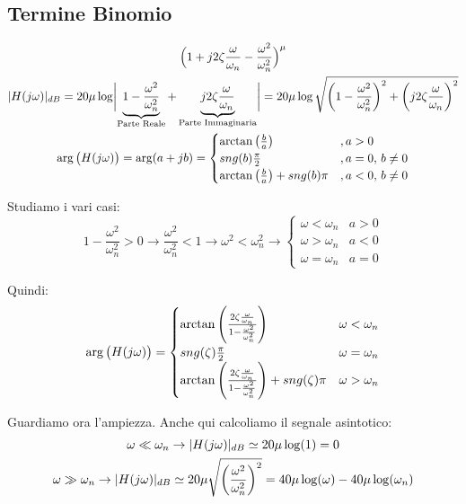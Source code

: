 \subsection{Termine Binomio}
\begin{gather*}
	\Big(1+j2\zeta\frac{\omega}{\omega_{n}}-\frac{\omega^2}{\omega^{2}_{n}} \Big)^{\mu}\\
	\abs{H(j\omega)}_{dB} = 20 \mu \log \Abs{\underbrace{1-\frac{\omega^2}{\omega^{2}_{n}}}_{\text{\scriptsize Parte Reale}}+\underbrace{j2\zeta\frac{\omega}{\omega_{n}}}_{\text{\scriptsize Parte Immaginaria}}} = 20\mu \log \sqrt{\bigg(1-\frac{\omega^2}{\omega^{2}_{n}} \bigg)^2+\bigg(j2\zeta\frac{\omega}{\omega_{n}}\bigg)^2}\\
	\arg\big(H(j\omega)\big) = \arg(a+jb) = 
	\begin{cases}
		\arctan\big(\frac{b}{a}\big) & ,a>0\\
		\sng(b)\frac{\pi}{2} & ,a=0,\, b \ne 0\\
		\arctan\big(\frac{b}{a}\big) + \sng(b)\pi & ,a<0,\, b \ne 0 
	\end{cases} 
\end{gather*}

Studiamo i vari casi:
\[ 
	1-\frac{\omega^2}{\omega^{2}_{n}}>0 \rightarrow \frac{\omega^2}{\omega^{2}_{n}} <1 \rightarrow \omega^2 < \omega^2_n \rightarrow 
	\begin{cases}
		\omega < \omega_n &a>0\\
		\omega > \omega_n &a<0\\
		\omega = \omega_n &a=0
	\end{cases}
\]

Quindi:
\[ 
 	\arg\big(H(j\omega)\big) = 
 	\begin{cases}
	 	\arctan\Bigg(\frac{2\zeta\frac{\omega}{\omega_n}}{1-\frac{\omega^2}{\omega^{2}_{n}}}\Bigg) & \omega < \omega_n\\
	 	sng(\zeta)\frac{\pi}{2} &	\omega = \omega_n\\
	 	\arctan\Bigg(\frac{2\zeta\frac{\omega}{\omega_n}}{1-\frac{\omega^2}{\omega^{2}_{n}}}\Bigg)+ sng(\zeta)\pi & \omega > \omega_n\\
 	\end{cases}
\]
  
Guardiamo ora l'ampiezza. Anche qui calcoliamo il segnale asintotico:
\begin{gather*}
  	\omega \ll \omega_n \rightarrow \lvert H(j\omega)\rvert_{dB}\simeq 20\mu \log(1) = 0\\
  	\omega \gg \omega_n \rightarrow \lvert H(j\omega)\rvert_{dB}\simeq 20\mu \sqrt{	\bigg(\frac{\omega^2}{\omega^2_n}\bigg)^2} = 40\mu \log(\omega)-40 \mu \log(\omega_n)
\end{gather*}

